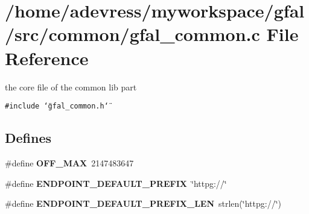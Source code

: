 \section{/home/adevress/myworkspace/gfal/src/common/gfal\_\-common.c File Reference}
\label{gfal__common_8c}
the core file of the common lib part 

{\tt \#include \char`\"{}gfal\_\-common.h\char`\"{}}\par
\subsection*{Defines}
\begin{CompactItemize}
\item 
\#define \textbf{OFF\_\-MAX}~2147483647\label{gfal__common_8c_616a28e950e9272a02aa05e39154d50e}

\item 
\#define \textbf{ENDPOINT\_\-DEFAULT\_\-PREFIX}~\char`\"{}httpg://\char`\"{}\label{gfal__common_8c_0bb77a5d8a45b2679d2c1784e5ac2686}

\item 
\#define \textbf{ENDPOINT\_\-DEFAULT\_\-PREFIX\_\-LEN}~strlen(\char`\"{}httpg://\char`\"{})\label{gfal__common_8c_fb26b505193c80088cceb0cdf63cc257}

\end{CompactItemize}
